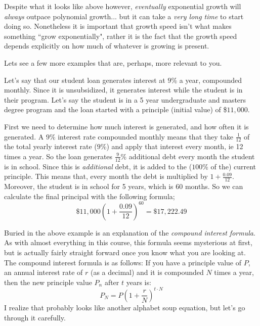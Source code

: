 \documentclass{ximera}
\begin{document}
    Despite what it looks like above however, \textit{eventually} exponential growth will \textit{always} outpace polynomial growth... but it can take a \textit{very long time} to start doing so. Nonetheless it is important that growth speed isn't what makes something ``grow exponentially", rather it is the fact that the growth speed depends explicitly on how much of whatever is growing is present.
    
    Lets see a few more examples that are, perhaps, more relevant to you.
    
    \begin{explanation}%
        Let's say that our student loan generates interest at $9$\% a year, compounded monthly. Since it is unsubsidized, it generates interest while the student is in their program. Let's say the student is in a 5 year undergraduate and masters degree program and the loan started with a principle (initial value) of \$$11,000$.
        
        First we need to determine how much interest is generated, and how often it is generated. A $9$\% interest rate compounded monthly means that they take $\frac{1}{12}$ of the total yearly interest rate ($9$\%) and apply that interest every month, ie 12 times a year. So the loan generates $\frac{9}{12}$\% additional debt every month the student is in school. Since this is \textit{additional} debt, it is added to the ($100$\% of the) current principle. This means that, every month the debt is multiplied by $1 + \frac{0.09}{12}$. Moreover, the student is in school for 5 years, which is 60 months. So we can calculate the final principal with the following formula;
        \[
            \$11,000\left(1 + \frac{0.09}{12}\right)^{60} = \$17,222.49
        \]
    \end{explanation}%
        
    Buried in the above example is an explanation of the \textit{compound interest formula}. As with almost everything in this course, this formula seems mysterious at first, but is actually fairly straight forward once you know what you are looking at. The compound interest formula is as follows: If you have a principle value of $P$, an annual interest rate of $r$ (as a decimal) and it is compounded $N$ times a year, then the new principle value $P_n$ after $t$ years is:
    \[
        P_N = P\left(1 + \frac{r}{N}\right)^{t\cdot N}
    \]
    I realize that probably looks like another alphabet soup equation, but let's go through it carefully.
    
\end{document}
